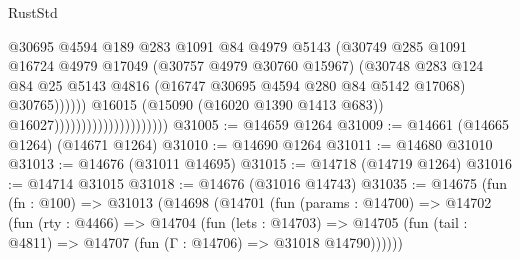 \begin{lexlean}{RustStd}
\begin{coremodule}
                                                      @30695
                                                      @4594
                                                      @189
                                                      @283
                                                      @1091
                                                      @84
                                                      @4979
                                                      @5143
                                                      (@30749
                                                        @285
                                                        @1091
                                                        @16724
                                                        @4979
                                                        @17049
                                                        (@30757 @4979 @30760 @15967)
                                                        (@30748
                                                          @283
                                                          @124
                                                          @84
                                                          @25
                                                          @5143
                                                          @4816
                                                          (@16747
                                                            @30695
                                                            @4594
                                                            @280
                                                            @84
                                                            @5142
                                                            @17068)
                                                          @30765))))))
                                              @16015
                                              (@15090 (@16020 @1390 @1413 @683))
                                              @16027)))))))))))))))))))))
@31005 := @14659 @1264
@31009 := @14661 (@14665 @1264) (@14671 @1264)
@31010 := @14690 @1264
@31011 := @14680 @31010
@31013 := @14676 (@31011 @14695)
@31015 := @14718 (@14719 @1264)
@31016 := @14714 @31015
@31018 := @14676 (@31016 @14743)
@31035 := @14675
    (fun (fn : @100) =>
    @31013
      (@14698
        (@14701
          (fun (params : @14700) =>
          @14702
            (fun (rty : @4466) =>
            @14704
              (fun (lets : @14703) =>
              @14705 (fun (tail : @4811) => @14707 (fun (Γ : @14706) => @31018 @14790))))))

\end{coremodule}
\end{lexlean}
